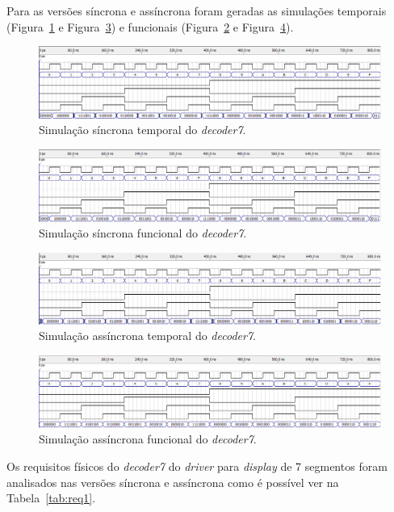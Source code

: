 \documentclass[12pt]{article}
\begin{document}
Para as versões síncrona e assíncrona foram geradas as simulações temporais (Figura~\ref{fig:ex1st} e Figura~\ref{fig:ex1ast}) e funcionais (Figura~\ref{fig:ex1sf} e Figura~\ref{fig:ex1asf}).

\begin{figure}[H]
	\centering
	\includegraphics[width=.8\textwidth]{ex1_st.png}
	\caption{Simulação síncrona temporal do \textit{decoder7}.}
	\label{fig:ex1st}
\end{figure}

\begin{figure}[H]
	\centering
	\includegraphics[width=.8\textwidth]{ex1_sf.png}
	\caption{Simulação síncrona funcional do \textit{decoder7}.}
	\label{fig:ex1sf}
\end{figure}

\begin{figure}[H]
	\centering
	\includegraphics[width=.8\textwidth]{ex1_ast.png}
	\caption{Simulação assíncrona temporal do \textit{decoder7}.}
	\label{fig:ex1ast}
\end{figure}

\begin{figure}[H]
	\centering
	\includegraphics[width=.8\textwidth]{ex1_asf.png}
	\caption{Simulação assíncrona funcional do \textit{decoder7}.}
	\label{fig:ex1asf}
\end{figure}

Os requisitos físicos do \textit{decoder7} do \textit{driver} para \textit{display} de 7 segmentos foram analisados nas versões síncrona e assíncrona como é possível ver na Tabela~\ref{tab:req1}.
\end{document}
